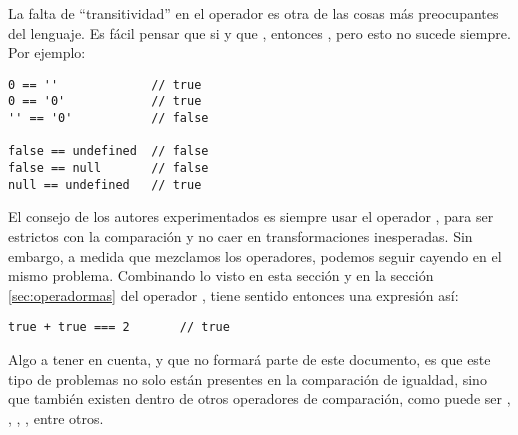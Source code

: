 La falta de "`transitividad"' en el operador \code{==} es otra de las cosas más preocupantes del lenguaje. Es fácil pensar que si  y que , entonces , pero esto no sucede siempre.  Por ejemplo:

\begin{lstlisting}[title={Falta de transitividad en \code{==}}]
0 == ''             // true
0 == '0'            // true
'' == '0'           // false

false == undefined  // false
false == null       // false
null == undefined   // true
\end{lstlisting}

El consejo de los autores experimentados es siempre usar el operador \code{===}, para ser estrictos con la comparación y no caer en transformaciones inesperadas. Sin embargo, a medida que mezclamos los operadores, podemos seguir cayendo en el mismo problema. Combinando lo visto en esta sección y en la sección \ref{sec:operadormas} del operador \code{+}, tiene sentido entonces una expresión así:

\begin{lstlisting}
true + true === 2		// true
\end{lstlisting}

Algo a tener en cuenta, y que no formará parte de este documento, es que este tipo de problemas no solo están presentes en la comparación de igualdad, sino que también existen dentro de otros operadores de comparación, como puede ser \code{>}, \code{>=}, \code{<}, \code{<=}, entre otros.
